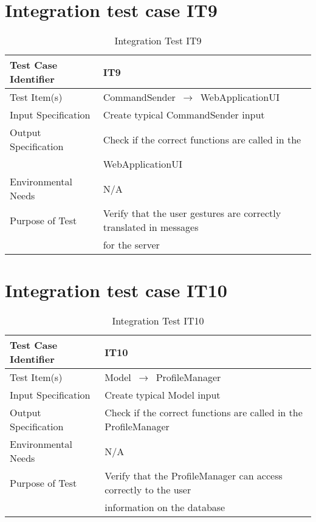 \documentclass[../../testPlan.tex]{subfiles}
\begin{document}
	\section{Integration test case IT9}
		\begin{table}[H]
			\centering
			\label{IT9}
			\begin{tabular}{ll}
				\hline
				Test Case Identifier & IT9  \\ \hline
				Test Item(s)         & CommandSender $\,\to\,$ WebApplicationUI\\ \hline
				Input Specification  & Create typical CommandSender input  \\ \hline
				Output Specification & Check if the correct functions are called in the \\ & WebApplicationUI\\ \hline
				Environmental Needs  &  N/A \\ \hline
				Purpose of Test      &  Verify that the user gestures are correctly translated in messages \\ & for the server  \\ \hline
			\end{tabular}
			\caption{Integration Test IT9}
		\end{table}
		
		
	\section{Integration test case IT10}
		\begin{table}[H]
			\centering
			\label{IT10}
			\begin{tabular}{ll}
				\hline
				Test Case Identifier & IT10  \\ \hline
				Test Item(s)         & Model $\,\to\,$ ProfileManager\\ \hline
				Input Specification  & Create typical Model input  \\ \hline
				Output Specification & Check if the correct functions are called in the ProfileManager\\ \hline
				Environmental Needs  &  N/A \\ \hline
				Purpose of Test      &  Verify that the ProfileManager can access correctly to the user \\ & information on the database \\ \hline
			\end{tabular}
			\caption{Integration Test IT10}
		\end{table}
		
\end{document}
